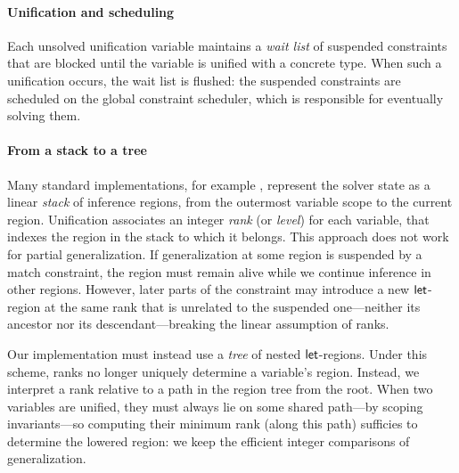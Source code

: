 \documentclass[acmsmall,screen,nonacm,review]{acmart}
\begin{document}
\paragraph{Unification and scheduling}

Each unsolved unification variable maintains a \emph{wait list} of suspended
constraints that are blocked until the variable is unified with a concrete
type. When such a unification occurs, the wait list is flushed: the suspended
constraints are scheduled on the global constraint scheduler, which is
responsible for eventually solving them.

\paragraph{From a stack to a tree}



Many standard \ML implementations, for example \Inferno, represent the solver
state as a linear \emph{stack} of inference regions, from the outermost
variable scope to the current region. Unification associates
an integer \emph{rank} (or \emph{level}) for each variable, that indexes the
region in the stack to which it belongs.
%
This approach does not work for partial generalization. If
generalization at some region is suspended by a match constraint, the
region must remain alive while we continue inference in other
regions. However, later parts of the constraint may introduce a new
$\mathopen{}\mathrel{\mathsf{let}}$-region at the same rank that is unrelated to the suspended one---neither its
ancestor nor its descendant---breaking the linear assumption of ranks.

Our implementation must instead use a \emph{tree} of nested
$\mathopen{}\mathrel{\mathsf{let}}$-regions. Under this scheme, ranks no longer uniquely determine a
variable's region. Instead, we interpret a rank relative to a path in the
region tree from the root. When two variables are unified, they must always
lie on some shared path---by scoping invariants---so computing their minimum
rank (along this path) sufficies to determine the lowered region: we keep
the efficient integer comparisons of generalization.
\end{document}
